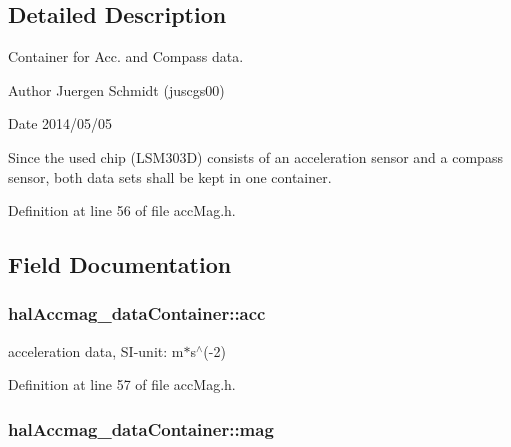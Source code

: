 \subsection{Detailed Description}
Container for Acc. and Compass data. 



 \begin{DoxyAuthor}{Author}
Juergen Schmidt (juscgs00) 
\end{DoxyAuthor}
\begin{DoxyDate}{Date}
2014/05/05
\end{DoxyDate}
Since the used chip (L\+S\+M303\+D) consists of an acceleration sensor and a compass sensor, both data sets shall be kept in one container.

Definition at line 56 of file acc\+Mag.\+h.



\subsection{Field Documentation}
\hypertarget{structhalAccmag__dataContainer_afc3847993eed1c8f1e67028ad6d2a6cf_afc3847993eed1c8f1e67028ad6d2a6cf}{
\subsubsection[{acc}]{ hal\+Accmag\+\_\+data\+Container\+::acc}}\label{structhalAccmag__dataContainer_afc3847993eed1c8f1e67028ad6d2a6cf_afc3847993eed1c8f1e67028ad6d2a6cf}


acceleration data, S\+I-\/unit\+: m$\ast$s$^\wedge$(-\/2) 



Definition at line 57 of file acc\+Mag.\+h.

\hypertarget{structhalAccmag__dataContainer_a903681a66ce49c39267aa66d471812f7_a903681a66ce49c39267aa66d471812f7}{
\subsubsection[{mag}]{ hal\+Accmag\+\_\+data\+Container\+::mag}}\label{structhalAccmag__dataContainer_a903681a66ce49c39267aa66d471812f7_a903681a66ce49c39267aa66d471812f7}


